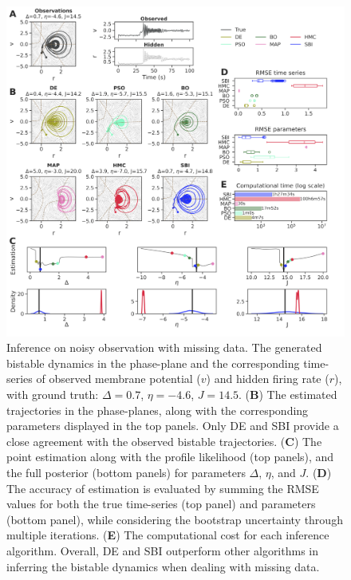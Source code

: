 \documentclass[preprint,11pt,authoryear]{elsarticle}
\begin{document}
\begin{figure}
    \centering
    \includegraphics[width=\linewidth]{Figs/Fig4.png}
    \caption{Inference on noisy observation with missing data. The generated bistable dynamics in the phase-plane and the corresponding time-series of observed membrane potential ($v$) and hidden firing rate ($r$), with ground truth: $\Delta=0.7$, $\eta=-4.6$, $J=14.5$.  (\textbf{B}) The estimated trajectories in the phase-planes, along with the corresponding parameters displayed in the top panels. Only DE and SBI provide a close agreement with the observed bistable trajectories. (\textbf{C}) The point estimation along with the profile likelihood (top panels), and the full posterior (bottom panels) for parameters $\Delta$, $\eta$, and $J$. (\textbf{D}) The accuracy of estimation is evaluated by summing the RMSE values for both the true time-series (top panel) and parameters (bottom panel),  while considering the bootstrap uncertainty through multiple iterations. (\textbf{E}) The computational cost for each inference algorithm.  Overall,  DE and SBI outperform other algorithms in inferring the bistable dynamics when dealing with missing data.
    }
    \label{fig:Missingdata}
\end{figure}
\end{document}
